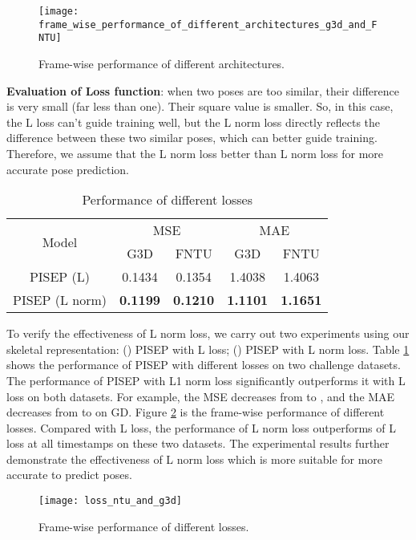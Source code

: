 \documentclass[journal]{IEEEtran}
\begin{document}
\begin{figure}[!t]
\centering
\texttt{[image: frame\_wise\_performance\_of\_different\_architectures\_g3d\_and\_FNTU]}
\caption{Frame-wise performance of different architectures.}
\label{fig10}
\end{figure}

{\bf Evaluation of Loss function}: when two poses are too similar, their difference is very small (far less than one). Their square value is smaller. So, in this case, the L loss can't guide training well, but the L norm loss directly reflects the difference between these two similar poses, which can better guide training. Therefore, we assume that the L norm loss better than L norm loss for more accurate pose prediction.

\begin{table}[!t]
\renewcommand{\arraystretch}{1.3}
\caption{Performance of different losses}
\label{table4}
\centering
\begin{tabular}{ccccc}
\hline
\multirow{2}{*}{Model}& \multicolumn{2}{c}{MSE} & \multicolumn{2}{c}{MAE} \\
 \cline{2-5}& G3D &FNTU & G3D &FNTU  \\
\hline
PISEP (L)&0.1434&0.1354&1.4038&1.4063 \\
PISEP (L norm)&{\bf 0.1199}&{\bf 0.1210}&{\bf 1.1101}&{\bf 1.1651} \\
\hline
\end{tabular}
\end{table}

To verify the effectiveness of L norm loss, we carry out two experiments using our skeletal representation: () PISEP with L loss; () PISEP with L norm loss. Table \ref{table4} shows the performance of PISEP with different losses on two challenge datasets. The performance of PISEP with L1 norm loss significantly outperforms it with L loss on both datasets. For example, the MSE decreases from  to , and the MAE decreases from  to  on GD. Figure \ref{fig11} is the frame-wise performance of different losses. Compared with L loss, the performance of L norm loss outperforms of L loss at all timestamps on these two datasets. The experimental results further demonstrate the effectiveness of L norm loss which is more suitable for more accurate to predict poses.

\begin{figure}[!t]
\centering
\texttt{[image: loss\_ntu\_and\_g3d]}
\caption{Frame-wise performance of different losses.}
\label{fig11}
\end{figure}
\end{document}
